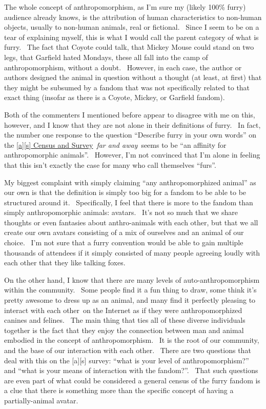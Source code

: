 The whole concept of anthropomorphism, as I'm sure my (likely 100\%
furry) audience already knows, is the attribution of human
characteristics to non-human objects, usually to non-human animals, real
or fictional. ~Since I seem to be on a tear of explaining myself, this
is what I would call the parent category of what is furry. ~The fact
that Coyote could talk, that Mickey Mouse could stand on two legs, that
Garfield hated Mondays, these all fall into the camp of
anthropomorphism, without a doubt. ~However, in each case, the author or
authors designed the animal in question without a thought (at least, at
first) that they might be subsumed by a fandom that was not specifically
related to that exact thing (insofar as there is a Coyote, Mickey, or
Garfield fandom).

Both of the commenters I mentioned before appear to disagree with me on
this, however, and I know that they are not alone in their definitions
of furry. ~In fact, the number one response to the question ``Describe
furry in your own words'' on the
\href{http://survey.adjectivespecies.com/2012}{{[}a{]}{[}s{]} Census and
Survey}~\emph{far and away}~seems to be ``an affinity for
anthropomorphic animals''. ~However, I'm not convinced that I'm alone in
feeling that this isn't exactly the case for many who call themselves
``furs''.

My biggest complaint with simply claiming ``any anthropomorphized
animal'' as our own is that the definition is simply too big for a
fandom to be able to be structured around it. ~Specifically, I feel that
there is more to the fandom than simply anthropomorphic animals:
avatars. ~It's not so much that we share thoughts or even fantasies
about anthro-animals with each other, but that we all create our own
avatars consisting of a mix of ourselves and an animal of our choice.
~I'm not sure that a furry convention would be able to gain multiple
thousands of attendees if it simply consisted of many people agreeing
loudly with each other that they like talking foxes.

On the other hand, I know that there are many levels of
auto-anthropomorphism within the community. ~Some people find it a fun
thing to draw, some think it's pretty awesome to dress up as an animal,
and many find it perfectly pleasing to interact with each other~on the
Internet as if they were anthropomorphized canines and felines. ~The
main thing that ties all of these diverse individuals together is the
fact that they enjoy the connection between man and animal embodied in
the concept of anthropomorphism. ~It is the root of our community, and
the base of our interaction with each other. ~There are two questions
that deal with this on the {[}a{]}{[}s{]} survey: ``what is your level
of anthropomorphism?'' and ``what is your means of interaction with the
fandom?''. ~That such questions are even part of what could be
considered a general census of the furry fandom is a clue that there is
something more than the specific concept of having a partially-animal
avatar.

